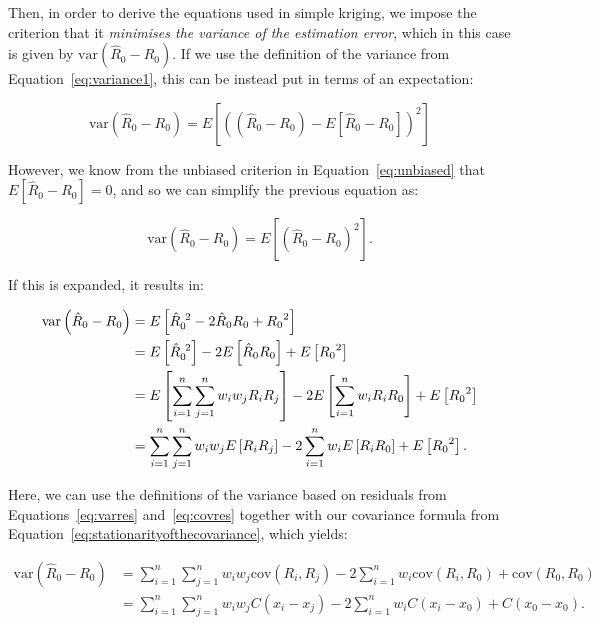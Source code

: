 Then, in order to derive the equations used in simple kriging, we impose the criterion that it \emph{minimises the variance of the estimation error}, which in this case is given by \(\mathrm{var}\left(\hat{R}_0 - R_0\right)\).
If we use the definition of the variance from Equation~\ref{eq:variance1}, this can be instead put in terms of an expectation:

\begin{equation}
\mathrm{var}\left(\hat{R}_0 - R_0\right) = E \left[ \left( \left(\hat{R}_0 - R_0\right) - E \left[\hat{R}_0 - R_0\right] \right)^2 \right] \nonumber
\end{equation}

However, we know from the unbiased criterion in Equation~\ref{eq:unbiased} that \(E\left[ \hat{R}_0 - R_0 \right] = 0\), and so we can simplify the previous equation as:

\begin{equation}
\mathrm{var}\left(\hat{R}_0 - R_0\right) = E\left[\left( \hat{R}_0 - R_0 \right)^2\right] \nonumber.
\end{equation}

If this is expanded, it results in:

\begin{align}
\mathrm{var}\left(\hat{R}_0 - R_0\right) &= E\left[{\hat{R}_0}^{\hspace{1.2mm}2} - 2\hat{R}_0R_0 + {R_0}^2 \right] \nonumber \\
&= E\left[{\hat{R}_0}^{\hspace{1.2mm}2}\right] - 2E\left[\hat{R}_0R_0\right] + E\left[{R_0}^2 \right] \nonumber \\
&= E\left[\sum_{i=1}^n \sum_{j=1}^n w_i w_j R_i R_j\right] - 2E\left[\sum_{i=1}^n w_i R_i R_0\right] + E\left[{R_0}^2 \right] \nonumber \\
&= \sum_{i=1}^n \sum_{j=1}^n w_i w_j E\left[R_i R_j\right] - 2\sum_{i=1}^n w_i E\left[R_i R_0\right] + E\left[{R_0}^2 \right]. \nonumber
\end{align}

Here, we can use the definitions of the variance based on residuals from Equations~\ref{eq:varres} and~\ref{eq:covres} together with our covariance formula from Equation~\ref{eq:stationarityofthecovariance}, which yields:

\begin{align}
\mathrm{var}\left(\hat{R}_0 - R_0\right) &= \sum_{i=1}^n \sum_{j=1}^n w_i w_j \mathrm{cov}(R_i, R_j) - 2\sum_{i=1}^n w_i \mathrm{cov}(R_i,R_0) + \mathrm{cov}(R_0, R_0) \label{eq:variancesk} \\
&= \sum_{i=1}^n \sum_{j=1}^n w_i w_j C(x_i-x_j) - 2\sum_{i=1}^n w_i C(x_i-x_0) + C(x_0-x_0).
\end{align}

